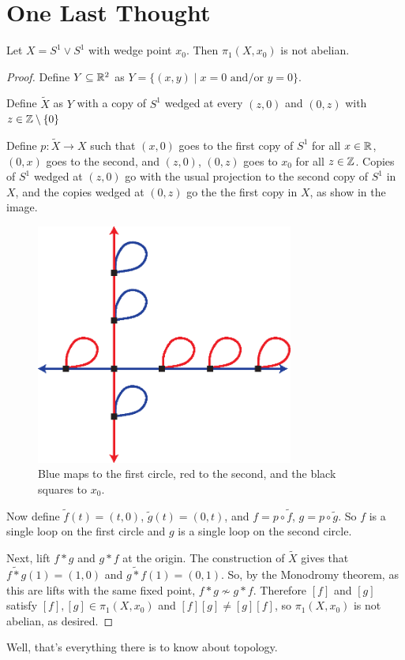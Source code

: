 \section{One Last Thought}
\begin{example}
Let $X = S^1 \vee S^1$ with wedge point $x_0$.  Then $\pi_1(X, x_0)$ is not abelian.
\end{example}
\begin{proof}
Define $Y \subseteq \mathbb R^2$ as $Y = \{ (x,y) \mid x = 0 \text{ and/or } y = 0\}$.

Define $\widetilde{X}$ as $Y$ with a copy of $S^1$ wedged at every $(z,0)$ and $(0,z)$ with $z \in \mathbb Z \setminus \{0\}$

Define $p : \widetilde{X} \to X$ such that $(x,0)$ goes to the first copy of $S^1$ for all $x \in \mathbb R$, $(0,x)$ goes to the second, and $(z,0)$, $(0,z)$ goes to $x_0$ for all $z \in \mathbb Z$.  Copies of $S^1$ wedged at $(z,0)$ go with the usual projection to the second copy of $S^1$ in $X$, and the copies wedged at $(0,z)$ go the the first copy in $X$, as show in the image.

\begin{figure}[ht!]
\begin{center}
\includegraphics[width=240pt]{images/covering_spaces/nonabelian}
\caption{Blue maps to the first circle, red to the second, and the black squares to $x_0$.}
\end{center}
\end{figure}

Now define $\widetilde{f}(t) = (t,0)$, $\widetilde{g}(t) = (0,t)$, and $f = p \circ \widetilde{f}$, $g = p \circ \widetilde{g}$.  So $f$ is a single loop on the first circle and $g$ is a single loop on the second circle.

Next, lift $f * g$ and $g * f$ at the origin.  The construction of $\widetilde{X}$ gives that $\widetilde{f * g}(1) = (1,0)$ and $\widetilde{g * f}(1) = (0,1)$.  So, by the Monodromy theorem, as this are lifts with the same fixed point, $f * g \not \sim g * f$.  Therefore $[f]$ and $[g]$ satisfy $[f],[g] \in \pi_1(X,x_0)$ and $[f][g] \neq [g][f]$, so $\pi_1(X,x_0)$ is not abelian, as desired.

\end{proof}

Well, that's everything there is to know about topology.  


